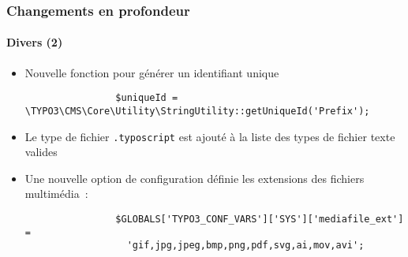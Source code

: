 \begin{frame}[fragile]
	\frametitle{Changements en profondeur}
	\framesubtitle{Divers (2)}


	\begin{itemize}

		\item Nouvelle fonction pour générer un identifiant unique

			\begin{lstlisting}
				$uniqueId = \TYPO3\CMS\Core\Utility\StringUtility::getUniqueId('Prefix');
			\end{lstlisting}

		\item Le type de fichier \texttt{.typoscript} est ajouté à la liste des types de fichier texte valides

		\item Une nouvelle option de configuration définie les extensions des fichiers multimédia~:

			\begin{lstlisting}
				$GLOBALS['TYPO3_CONF_VARS']['SYS']['mediafile_ext'] =
				  'gif,jpg,jpeg,bmp,png,pdf,svg,ai,mov,avi';
			\end{lstlisting}

	\end{itemize}

	\breakingchange

\end{frame}

